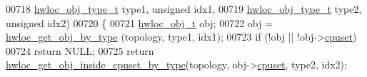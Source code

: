 \begin{DoxyCode}
00718                              \hyperlink{a00041_gacd37bb612667dc437d66bfb175a8dc55}{hwloc_obj_type_t} type1, \textcolor{keywordtype}{unsigned} idx1,
00719                              \hyperlink{a00041_gacd37bb612667dc437d66bfb175a8dc55}{hwloc_obj_type_t} type2, \textcolor{keywordtype}{unsigned} idx2)
00720 \{
00721   \hyperlink{a00016}{hwloc_obj_t} obj;
00722   obj = \hyperlink{a00047_ga9be4a03488cdd0fb431e4aa1cbdea895}{hwloc_get_obj_by_type} (topology, type1, idx1);
00723   \textcolor{keywordflow}{if} (!obj || !obj->\hyperlink{a00016_a67925e0f2c47f50408fbdb9bddd0790f}{cpuset})
00724     \textcolor{keywordflow}{return} NULL;
00725   \textcolor{keywordflow}{return} \hyperlink{a00054_gaa8dcdb85224f7350b90fb0a1ca91e6d6}{hwloc_get_obj_inside_cpuset_by_type}(topology, obj->\hyperlink{a00016_a67925e0f2c47f50408fbdb9bddd0790f}{cpuset}, type2, idx2);
      

\end{DoxyCode}
